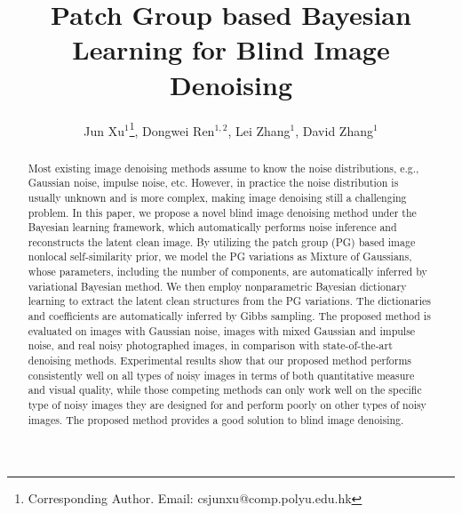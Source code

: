\documentclass[runningheads]{llncs}
\begin{document}
\newcommand{\point}{
    \raise0.7ex\hbox{.}
    }


\pagestyle{headings}

\mainmatter

\title{Patch Group based Bayesian Learning for Blind Image Denoising} %


\author{Jun Xu$^{1}$\footnote{Corresponding Author. Email: csjunxu@comp.polyu.edu.hk}, Dongwei Ren$^{1,2}$, Lei Zhang$^{1}$, David Zhang$^{1}$} %

\maketitle

\begin{abstract}
Most existing image denoising methods assume to know the noise distributions, e.g., Gaussian noise, impulse noise, etc. However, in practice the noise distribution is usually unknown and is more complex, making image denoising still a challenging problem. In this paper, we propose a novel blind image denoising method under the Bayesian learning framework, which automatically performs noise inference and reconstructs the latent clean image. By utilizing the patch group (PG) based image nonlocal self-similarity prior, we model the PG variations as Mixture of Gaussians, whose parameters, including the number of components, are automatically inferred by variational Bayesian method. We then employ nonparametric Bayesian dictionary learning to extract the latent clean structures from the PG variations. The dictionaries and coefficients are automatically inferred by Gibbs sampling. The proposed method is evaluated on images with Gaussian noise, images with mixed Gaussian and impulse noise, and real noisy photographed images, in comparison with state-of-the-art denoising methods. Experimental results show that our proposed method performs consistently well on all types of noisy images in terms of both quantitative measure and visual quality, while those competing methods can only work well on the specific type of noisy images they are designed for and perform poorly on other types of noisy images. The proposed method provides a good solution to blind image denoising.
\end{abstract}
\end{document}
